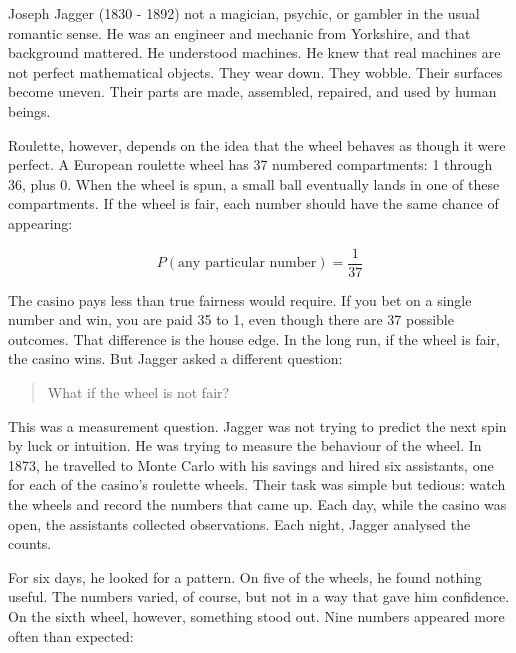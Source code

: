 \documentclass[
  letterpaper,
  DIV=11,
  numbers=noendperiod]{scrreprt}
\begin{document}
\begin{tcolorbox}[enhanced jigsaw, arc=.35mm, bottomrule=.15mm, bottomtitle=1mm, breakable, colback=white, colbacktitle=quarto-callout-note-color!10!white, colframe=quarto-callout-note-color-frame, coltitle=black, left=2mm, leftrule=.75mm, opacityback=0, opacitybacktitle=0.6, rightrule=.15mm, title=\textcolor{quarto-callout-note-color}{\faInfo}\hspace{0.5em}{Case Study: Joseph Jagger}, titlerule=0mm, toprule=.15mm, toptitle=1mm]

Joseph Jagger (1830 - 1892) not a magician, psychic, or gambler in the
usual romantic sense. He was an engineer and mechanic from Yorkshire,
and that background mattered. He understood machines. He knew that real
machines are not perfect mathematical objects. They wear down. They
wobble. Their surfaces become uneven. Their parts are made, assembled,
repaired, and used by human beings.

Roulette, however, depends on the idea that the wheel behaves as though
it were perfect. A European roulette wheel has 37 numbered compartments:
1 through 36, plus 0. When the wheel is spun, a small ball eventually
lands in one of these compartments. If the wheel is fair, each number
should have the same chance of appearing:

\[
P(\text{any particular number}) = \frac{1}{37}
\]

The casino pays less than true fairness would require. If you bet on a
single number and win, you are paid 35 to 1, even though there are 37
possible outcomes. That difference is the house edge. In the long run,
if the wheel is fair, the casino wins. But Jagger asked a different
question:

\begin{quote}
What if the wheel is not fair?
\end{quote}

This was a measurement question. Jagger was not trying to predict the
next spin by luck or intuition. He was trying to measure the behaviour
of the wheel. In 1873, he travelled to Monte Carlo with his savings and
hired six assistants, one for each of the casino's roulette wheels.
Their task was simple but tedious: watch the wheels and record the
numbers that came up. Each day, while the casino was open, the
assistants collected observations. Each night, Jagger analysed the
counts.

For six days, he looked for a pattern. On five of the wheels, he found
nothing useful. The numbers varied, of course, but not in a way that
gave him confidence. On the sixth wheel, however, something stood out.
Nine numbers appeared more often than expected:


\end{tcolorbox}
\end{document}

